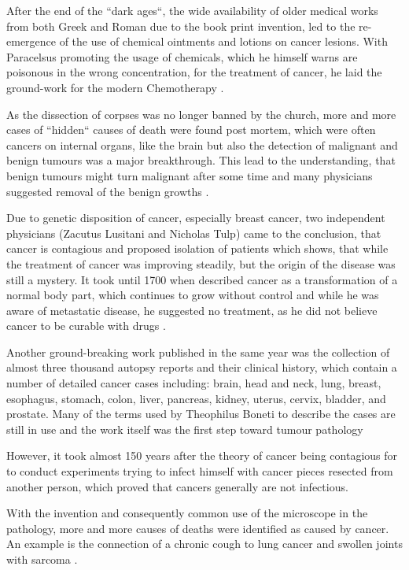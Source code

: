 After the end of the ``dark ages``, the wide availability of older medical works from both Greek and Roman due to the book print invention, led to the re-emergence of the use of chemical ointments and lotions on cancer lesions. With Paracelsus promoting the usage of chemicals, which he himself warns are poisonous in the wrong concentration, for the treatment of cancer, he laid the ground-work for the modern Chemotherapy \cite{PHT1562}.

As the dissection of corpses was no longer banned by the church, more and more cases of ``hidden`` causes of death were found post mortem, which were often cancers on internal organs, like the brain but also the detection of malignant and benign tumours was a major breakthrough. This lead to the understanding, that  benign tumours might turn malignant after some time and many physicians suggested removal of the benign growths \cite{Severino1632}.

Due to genetic disposition of cancer, especially breast cancer, two independent physicians (Zacutus Lusitani and Nicholas Tulp) came to the conclusion, that cancer is contagious and proposed isolation of patients \cite{Lusitani1649,Tulpii1652} which shows, that while the treatment of cancer was improving steadily, but the origin of the disease was still a mystery. It took until 1700 when \citeauthor{DeshaiesGendron1701} described cancer as a transformation of a normal body part, which continues to grow without control and while he was aware of metastatic disease, he suggested no treatment, as he did not believe cancer to be curable with drugs \cite{DeshaiesGendron1701}. 

Another ground-breaking work published in the same year was the collection of almost three thousand autopsy reports and their clinical history, which contain a number of detailed cancer cases including: brain, head and neck, lung, breast, esophagus, stomach, colon, liver, pancreas, kidney, uterus, cervix, bladder, and prostate. Many of the terms used by Theophilus Boneti to describe the cases are still in use and the work itself was the first step toward tumour pathology \cite{Hajdu2010a}


However, it took almost 150 years after the theory of cancer being contagious for \textcite{Nooth1804} to conduct experiments trying to infect himself with cancer pieces resected from another person, which proved that cancers generally are not infectious.

With the invention and consequently common use of the microscope in the pathology, more and more causes of deaths were identified as caused by cancer. An example is the connection of a chronic cough to lung cancer and swollen joints with sarcoma \cite{Etmueller2018}.

